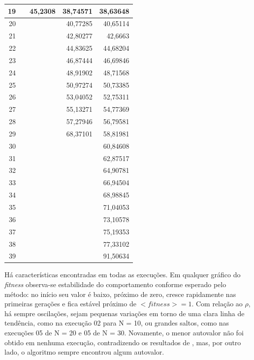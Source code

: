 \begin{table}[htb]
\begin{center}
\begin{tabular}{r|r|r|r|r}
	\hline
					19 &            &    45,2308 &   38,74571 &   38,63648 \\
	\hline
					20 &            &            &   40,77285 &   40,65114 \\
	\hline
					21 &            &            &   42,80277 &    42,6663 \\
	\hline
					22 &            &            &   44,83625 &   44,68204 \\
	\hline
					23 &            &            &   46,87444 &   46,69846 \\
	\hline
					24 &            &            &   48,91902 &   48,71568 \\
	\hline
					25 &            &            &   50,97274 &   50,73385 \\
	\hline
					26 &            &            &   53,04052 &   52,75311 \\
	\hline
					27 &            &            &   55,13271 &   54,77369 \\
	\hline
					28 &            &            &   57,27946 &   56,79581 \\
	\hline
					29 &            &            &   68,37101 &   58,81981 \\
	\hline
					30 &            &            &            &   60,84608 \\
	\hline
					31 &            &            &            &   62,87517 \\
	\hline
					32 &            &            &            &   64,90781 \\
	\hline
					33 &            &            &            &   66,94504 \\
	\hline
					34 &            &            &            &   68,98845 \\
	\hline
					35 &            &            &            &   71,04053 \\
	\hline
					36 &            &            &            &   73,10578 \\
	\hline
					37 &            &            &            &   75,19353 \\
	\hline
					38 &            &            &            &   77,33102 \\
	\hline
					39 &            &            &            &   91,50634 \\
	\hline \hline
	\end{tabular}
	\end{center}  
\end{table}
	
	Há características encontradas em todas as execuções. Em qualquer gráfico do \textit{fitness} observa-se estabilidade do comportamento conforme esperado pelo método: no início seu valor é baixo, próximo de zero, cresce rapidamente nas primeiras gerações e fica estável próximo de $<fitness> = 1$. Com relação ao $\rho$, há sempre oscilações, sejam pequenas variações em torno de uma clara linha de tendência, como na execução 02 para N = 10, ou grandes saltos, como nas execuções 05 de N = 20 e 05 de N = 30. Novamente, o menor autovalor não foi obtido em nenhuma execução, contradizendo os resultados de \cite{metodo2004}, mas, por outro lado, o algoritmo sempre encontrou algum autovalor.
	
